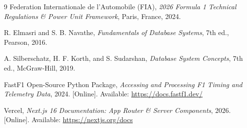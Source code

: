 \documentclass[12pt,a4paper]{report}
\begin{document}
\begin{thebibliography}{9}
Federation Internationale de l'Automobile (FIA), \emph{2026 Formula 1 Technical Regulations \& Power Unit Framework}, Paris, France, 2024.

R. Elmasri and S. B. Navathe, \emph{Fundamentals of Database Systems}, 7th ed., Pearson, 2016.

A. Silberschatz, H. F. Korth, and S. Sudarshan, \emph{Database System Concepts}, 7th ed., McGraw-Hill, 2019.

FastF1 Open-Source Python Package, \emph{Accessing and Processing F1 Timing and Telemetry Data}, 2024. [Online]. Available: \url{https://docs.fastf1.dev/}

Vercel, \emph{Next.js 16 Documentation: App Router \& Server Components}, 2026. [Online]. Available: \url{https://nextjs.org/docs}
\end{thebibliography}
\end{document}
